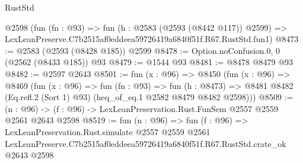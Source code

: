 \begin{lexlean}{RustStd}
\begin{coremodule}
    @2598
    (fun (fn : @93) =>
    fun (h : @2583 (@2593 (@8442 @117)) @2599) =>
    LexLeanPreserve.C7b2515af0eddeea59726419a6840f51f.R67.RustStd.fun1)
@8473 := @2583 (@2593 (@8428 @185)) @2599
@8478 := Option.noConfusion.{0, 0} (@2562 (@8433 @185)) @93
@8479 := @1544 @93
@8481 := @8478 @8479 @93
@8482 := @2597 @2643
@8501 := fun (x : @96) =>
  @8450
    (fun (x : @96) =>
    @8469
      (fun (x : @96) =>
      fun (fn : @93) =>
      fun (h : @8473) =>
      @8481 @8482 (Eq.refl.{2} (Sort 1) @93) (heq_of_eq.{1} @2582 @8479 @8482 @2598)))
@8509 := (n : @96) -> (f : @96) -> LexLeanPreservation.Rust.FunSem @2557 @2559 @2561 @2643 @2598
@8519 := fun (n : @96) =>
  fun (f : @96) =>
  LexLeanPreservation.Rust.simulate
    @2557
    @2559
    @2561
    LexLeanPreserve.C7b2515af0eddeea59726419a6840f51f.R67.RustStd.crate_ok
    @2643
    @2598
\end{coremodule}
\end{lexlean}
